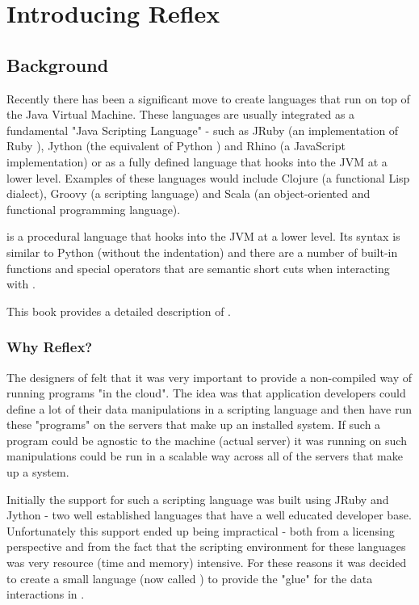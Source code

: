 
\part{Introducing Reflex}
\chapter{Background}
Recently there has been a significant move to create languages that run on top of the Java Virtual Machine. These languages are usually integrated as a fundamental "Java Scripting Language" - such as JRuby  (an implementation of Ruby ), Jython  (the equivalent of Python ) and Rhino  (a JavaScript  implementation) or as a fully defined language that hooks into the JVM at a lower level. Examples of these languages would include Clojure  (a functional Lisp dialect), Groovy  (a scripting language) and Scala  (an object-oriented and functional programming language). 

\Reflex is a procedural language that hooks into the JVM at a lower level. Its syntax is similar to Python (without the indentation) and there are a number of built-in functions and special operators that are semantic short cuts when interacting with \Rapture.

This book provides a detailed description of \Reflex.

\section{Why Reflex?}
The designers of \Rapture felt that it was very important to provide a non-compiled way of running programs "in the cloud". The idea was that \Rapture application developers could define a lot of their data manipulations in a scripting language and then have \Rapture run these "programs" on the servers that make up an installed system. If such a program could be agnostic to the machine (actual server) it was running on such manipulations could be run in a scalable way across all of the servers that make up a \Rapture system.

Initially the support for such a scripting language was built using JRuby and Jython - two well established languages that have a well educated developer base. Unfortunately this support ended up being impractical - both from a licensing perspective and from the fact that the scripting environment for these languages was very resource (time and memory) intensive. For these reasons it was decided to create a small language (now called \Reflex) to provide the "glue" for the data interactions in \Rapture.

